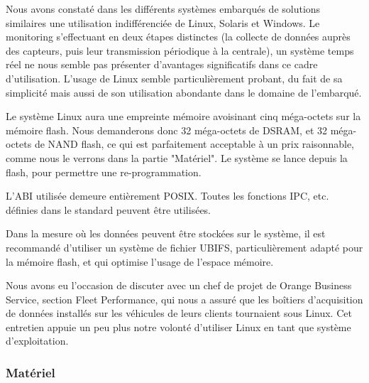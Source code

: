 Nous avons constaté dans les différents systèmes embarqués de solutions similaires une utilisation indifférenciée de Linux, Solaris et Windows\footnotemark. Le monitoring s'effectuant en deux étapes distinctes (la collecte de données auprès des capteurs, puis leur transmission périodique à la centrale), un système temps réel ne nous semble pas présenter d'avantages significatifs dans ce cadre d'utilisation. L'usage de Linux semble particulièrement probant, du fait de sa simplicité mais aussi de son utilisation abondante dans le domaine de l'embarqué.


Le système Linux aura une empreinte mémoire avoisinant cinq méga-octets sur la mémoire flash. Nous demanderons donc 32 méga-octets de DSRAM, et 32 méga-octets de NAND flash, ce qui est parfaitement acceptable à un prix raisonnable, comme nous le verrons dans la partie "Matériel". Le système se lance depuis la flash, pour permettre une re-programmation.


L'ABI utilisée demeure entièrement POSIX\footnotemark. Toutes les fonctions IPC, etc. définies dans le standard peuvent être utilisées\footnotemark.


Dans la mesure où les données peuvent être stockées sur le système, il est recommandé d'utiliser un système de fichier UBIFS\footnotemark, particulièrement adapté pour la mémoire flash, et qui optimise l'usage de l'espace mémoire.


Nous avons eu l’occasion de discuter avec un chef de projet de Orange Business Service, section Fleet Performance, qui nous a assuré que les boîtiers d'acquisition de données installés sur les véhicules de leurs clients tournaient sous Linux. Cet entretien appuie un peu plus notre volonté d'utiliser Linux en tant que système d'exploitation.

\subsubsection{Matériel}

